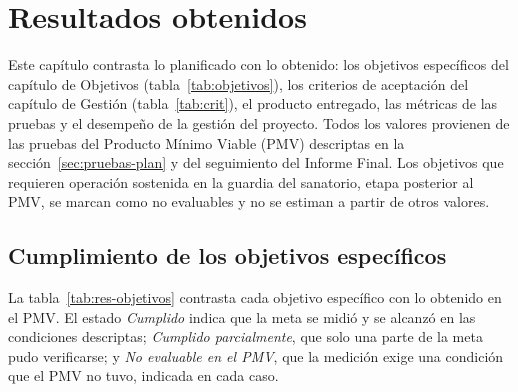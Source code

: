 \chapter{Resultados obtenidos}\label{cap:resultados}

Este capítulo contrasta lo planificado con lo obtenido: los objetivos específicos del capítulo de Objetivos (tabla~\ref{tab:objetivos}), los criterios de aceptación del capítulo de Gestión (tabla~\ref{tab:crit}), el producto entregado, las métricas de las pruebas y el desempeño de la gestión del proyecto. Todos los valores provienen de las pruebas del Producto Mínimo Viable (PMV) descriptas en la sección~\ref{sec:pruebas-plan} y del seguimiento del Informe Final. Los objetivos que requieren operación sostenida en la guardia del sanatorio, etapa posterior al PMV, se marcan como no evaluables y no se estiman a partir de otros valores.

\section{Cumplimiento de los objetivos específicos}\label{sec:res-objetivos}

La tabla~\ref{tab:res-objetivos} contrasta cada objetivo específico con lo obtenido en el PMV. El estado \emph{Cumplido} indica que la meta se midió y se alcanzó en las condiciones descriptas; \emph{Cumplido parcialmente}, que solo una parte de la meta pudo verificarse; y \emph{No evaluable en el PMV}, que la medición exige una condición que el PMV no tuvo, indicada en cada caso.

